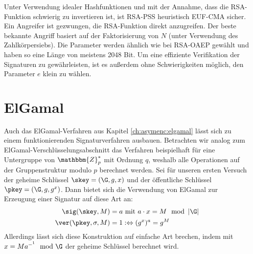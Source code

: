 Unter Verwendung idealer Hashfunktionen und mit der Annahme, dass die RSA-Funktion schwierig zu invertieren ist, ist RSA-PSS heuristisch EUF-CMA sicher. Ein Angreifer ist gezwungen, die RSA-Funktion direkt anzugreifen. Der beste bekannte Angriff basiert auf der Faktorisierung von $N$ (unter Verwendung des Zahlkörpersiebs). Die Parameter werden ähnlich wie bei RSA-OAEP gewählt und haben so eine Länge von meistens 2048 Bit. Um eine effiziente Verifikation der Signaturen zu gewährleisten, ist es außerdem ohne Schwierigkeiten möglich, den Parameter $e$ klein zu wählen.


\section{ElGamal}
Auch das ElGamal-Verfahren aus Kapitel \ref{ch:asymenc:elgamal} lässt sich zu einem funktionierenden Signaturverfahren ausbauen. Betrachten wir analog zum ElGamal-Verschlüsselungsabschnitt das Verfahren beispielhaft für eine Untergruppe von $\mathbbm{Z}^*_p$ mit Ordnung $q$, weshalb alle Operationen auf der Gruppenstruktur modulo $p$ berechnet werden. Sei für unseren ersten Versuch der geheime Schlüssel $\skey = (\G, g, x)$ und der öffentliche Schlüssel $\pkey = (\G, g, g^x)$. Dann bietet sich die Verwendung von ElGamal zur Erzeugung einer Signatur auf diese Art an:
\begin{align*}
\sig(\skey,M) &= a \text{ mit } a \cdot x = M \mod \left|\G\right|\\
\ver(\pkey,\sigma,M) &= 1 :\Leftrightarrow (g^x)^a = g^M
\end{align*}
Allerdings lässt sich diese Konstruktion auf einfache Art brechen, indem mit $x = M a^{-^1} \mod \G$ der geheime Schlüssel berechnet wird.

